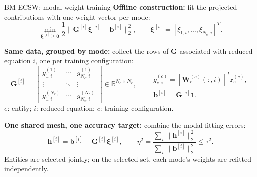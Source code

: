 \documentclass[aspectratio=169]{beamer}
\newcommand{\vect}[1]{\boldsymbol{#1}}
\newcommand{\matr}[1]{\boldsymbol{#1}}
\begin{document}
\begin{frame}{BM-ECSW: modal weight training}
\small
\setlength{\abovedisplayskip}{3pt}
\setlength{\belowdisplayskip}{3pt}
\setlength{\abovedisplayshortskip}{3pt}
\setlength{\belowdisplayshortskip}{3pt}
\textbf{Offline construction:} fit the projected contributions with one weight vector per mode:
\[
  \min_{\vect{\xi}^{[i]}\geq\vect{0}}
  \frac12\|\matr{G}^{[i]}\vect{\xi}^{[i]}-\vect{b}^{[i]}\|_2^2,
  \qquad
  \vect{\xi}^{[i]}=[\xi_{1,i},\ldots,\xi_{N_e,i}]^T.
\]

\textbf{Same data, grouped by mode:} collect the rows of $\matr{G}$ associated with reduced equation $i$, one per training configuration:
\[
  \matr{G}^{[i]}=
  \begin{bmatrix}
    g_{1,i}^{(1)} & \cdots & g_{N_e,i}^{(1)}\\
    \vdots & \ddots & \vdots\\
    g_{1,i}^{(N_c)} & \cdots & g_{N_e,i}^{(N_c)}
  \end{bmatrix}
  \in\mathbb R^{N_c\times N_e},
  \qquad
  \begin{gathered}
    g_{e,i}^{(c)}=[\matr{W}_e^{(c)}(:,i)]^T\vect{r}_e^{(c)},\\[3pt]
    \vect{b}^{[i]}=\matr{G}^{[i]}\vect{1}.
  \end{gathered}
\]
{\footnotesize $e$: entity; $i$: reduced equation; $c$: training configuration.}\par
\vspace{0.2em}
\textbf{One shared mesh, one accuracy target:} combine the modal fitting errors:
\[
  \vect{h}^{[i]}=\vect{b}^{[i]}-\matr{G}^{[i]}\vect{\xi}^{[i]},
  \qquad
  \eta^2=\frac{\sum_i\|\vect{h}^{[i]}\|_2^2}
                {\sum_i\|\vect{b}^{[i]}\|_2^2}\leq\tau^2.
\]
{\footnotesize Entities are selected jointly; on the selected set, each mode's weights are refitted independently.}
\end{frame}
\end{document}
